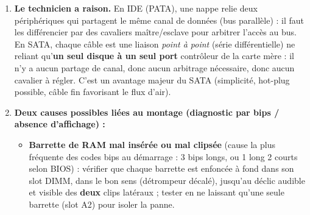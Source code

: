 \documentclass[11pt]{article}
\begin{document}
\begin{corrige}
\begin{enumerate}
\begin{enumerate}
    \item Relever le levier de verrouillage du socket (LGA1700, AM5, etc.) et ouvrir le capot de protection (load plate).
    \item Repérer le \textbf{détrompeur} : le coin marqué d'un triangle doré sur le processeur doit coïncider avec le triangle gravé sur le socket (et les encoches latérales du PCB du CPU avec les ergots du socket).
    \item Poser le processeur \emph{délicatement, sans forcer, sans glisser} : il doit s'insérer par son propre poids, parfaitement à plat. Ne jamais toucher les pads dorés (LGA) ou les broches (PGA ancien).
    \item Refermer le capot (load plate) et abaisser le levier de verrouillage jusqu'au clic (force modérée, levier dur à baisser = normal pour LGA).
    \item Appliquer une fine couche de \textbf{pâte thermique} (taille grain de riz / pois chiche) au centre du heatspreader (IHS) du processeur (si le ventirad n'en a pas pré-appliquée).
    \item Poser le ventilateur/radateur, l'aligner sur les trous de fixation, le fixer sur ses quatre plots (pousser les goupilles Intel / visser le backplate AMD) en croix pour pression uniforme, et brancher son connecteur \texttt{CPU\_FAN} (4 broches PWM) sur la carte mère.
  \end{enumerate}
  \item \textbf{Le technicien a raison.} En IDE (PATA), une nappe relie deux périphériques qui partagent le même canal de données (bus parallèle) : il faut les différencier par des cavaliers maître/esclave pour arbitrer l'accès au bus. En SATA, chaque câble est une liaison \emph{point à point} (série différentielle) ne reliant qu'\textbf{un seul disque à un seul port} contrôleur de la carte mère : il n'y a aucun partage de canal, donc aucun arbitrage nécessaire, donc aucun cavalier à régler. C'est un avantage majeur du SATA (simplicité, hot-plug possible, câble fin favorisant le flux d'air).
  \item \textbf{Deux causes possibles liées au montage (diagnostic par bips / absence d'affichage) :}
  \begin{itemize}
    \item \textbf{Barrette de RAM mal insérée ou mal clipsée} (cause la plus fréquente des codes bips au démarrage : 3 bips longs, ou 1 long 2 courts selon BIOS) : vérifier que chaque barrette est enfoncée à fond dans son slot DIMM, dans le bon sens (détrompeur décalé), jusqu'au déclic audible et visible des \textbf{deux} clips latéraux ; tester en ne laissant qu'une seule barrette (slot A2) pour isoler la panne.

\end{itemize}
\end{enumerate}
\end{corrige}
\end{document}
